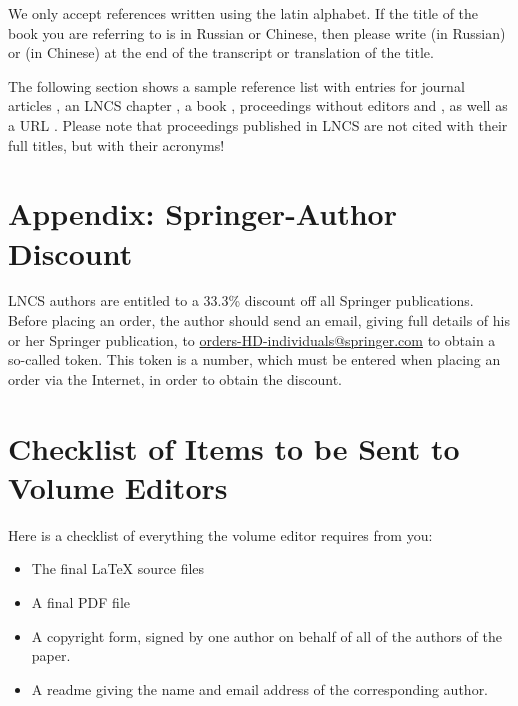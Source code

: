 \documentclass[runningheads,a4paper]{llncs}
\begin{document}
We only accept references written using the latin alphabet. If the title
of the book you are referring to is in Russian or Chinese, then please write
(in Russian) or (in Chinese) at the end of the transcript or translation
of the title.

The following section shows a sample reference list with entries for
journal articles \cite{jour}, an LNCS chapter \cite{lncschap}, a book
\cite{book}, proceedings without editors \cite{proceeding1} and
\cite{proceeding2}, as well as a URL \cite{url}.
Please note that proceedings published in LNCS are not cited with their
full titles, but with their acronyms!

 

\section*{Appendix: Springer-Author Discount}

LNCS authors are entitled to a 33.3\% discount off all Springer
publications. Before placing an order, the author should send an email, 
giving full details of his or her Springer publication,
to \url{orders-HD-individuals@springer.com} to obtain a so-called token. This token is a
number, which must be entered when placing an order via the Internet, in
order to obtain the discount.

\section{Checklist of Items to be Sent to Volume Editors}
Here is a checklist of everything the volume editor requires from you:


\begin{itemize}
\settowidth{\leftmargin}{{\Large$\square$}}\advance\leftmargin{}
\itemsep8pt\relax
\renewcommand\labelitemi{{\lower1.5pt\hbox{\Large$\square$}}}

\item The final \LaTeX{} source files
\item A final PDF file
\item A copyright form, signed by one author on behalf of all of the
authors of the paper.
\item A readme giving the name and email address of the
corresponding author.
\end{itemize}
\end{document}
